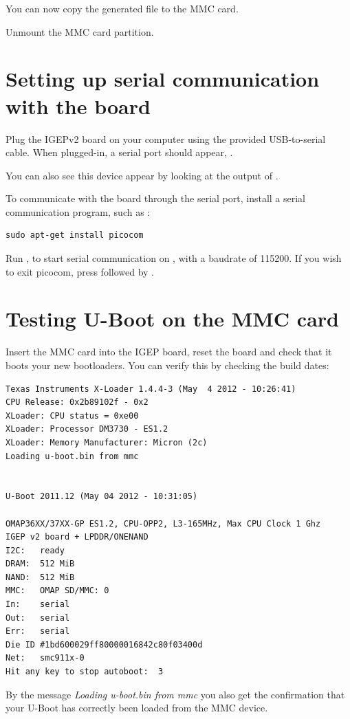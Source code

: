 You can now copy the generated  file to the MMC card.

Unmount the MMC card partition.

\section{Setting up serial communication with the board}

Plug the IGEPv2 board on your computer using the provided
USB-to-serial cable. When plugged-in, a serial port should appear,
.

You can also see this device appear by looking at the output of
.

To communicate with the board through the serial port, install a
serial communication program, such as :

\begin{verbatim}
sudo apt-get install picocom
\end{verbatim}

Run , to start serial
communication on , with a baudrate of 115200. If
you wish to exit picocom, press \code{[Ctrl][a]} followed by
\code{[Ctrl][x]}.

\section{Testing U-Boot on the MMC card}

Insert the MMC card into the IGEP board, reset the board and check
that it boots your new bootloaders. You can verify this by checking
the build dates:

\begin{verbatim}
Texas Instruments X-Loader 1.4.4-3 (May  4 2012 - 10:26:41)
CPU Release: 0x2b89102f - 0x2
XLoader: CPU status = 0xe00
XLoader: Processor DM3730 - ES1.2
XLoader: Memory Manufacturer: Micron (2c)
Loading u-boot.bin from mmc


U-Boot 2011.12 (May 04 2012 - 10:31:05)

OMAP36XX/37XX-GP ES1.2, CPU-OPP2, L3-165MHz, Max CPU Clock 1 Ghz
IGEP v2 board + LPDDR/ONENAND
I2C:   ready
DRAM:  512 MiB
NAND:  512 MiB
MMC:   OMAP SD/MMC: 0
In:    serial
Out:   serial
Err:   serial
Die ID #1bd600029ff80000016842c80f03400d
Net:   smc911x-0
Hit any key to stop autoboot:  3
\end{verbatim}

By the message {\em Loading u-boot.bin from mmc} you also get the
confirmation that your U-Boot has correctly been loaded from the MMC
device.

